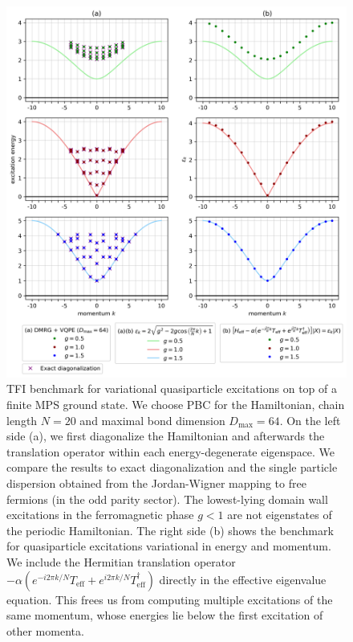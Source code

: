 \newpage
\begin{figure}[H]
  \centering
  \includegraphics[width=1.0\linewidth]{excitations.png}
  \caption{TFI benchmark for variational quasiparticle excitations on top of a finite MPS ground state. We choose PBC for the Hamiltonian, chain length $N = 20$ and maximal bond dimension $D_{\text{max}} = 64$. On the left side (a), we first diagonalize the Hamiltonian and afterwards the translation operator within each energy-degenerate eigenspace. We compare the results to exact diagonalization and the single particle dispersion obtained from the Jordan-Wigner mapping to free fermions (in the odd parity sector). The lowest-lying domain wall excitations in the ferromagnetic phase $g < 1$ are not eigenstates of the periodic Hamiltonian. The right side (b) shows the benchmark for quasiparticle excitations variational in energy and momentum. We include the Hermitian translation operator $- \alpha ( e^{-i 2\pi k / N} T_{\text{eff}} + e^{i 2\pi k / N} T_{\text{eff}}^{\dagger} )$ directly in the effective eigenvalue equation. This frees us from computing multiple excitations of the same momentum, whose energies lie below the first excitation of other momenta.}
\label{fig:excitations}
\end{figure}


